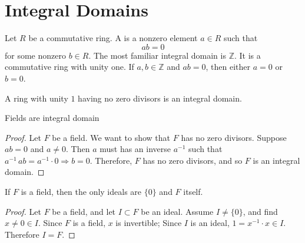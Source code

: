 \section{Integral Domains}

Let $R$ be a commutative ring. A  is a nonzero element $a \in R$ such that 
\begin{equation}
    ab=0
\end{equation}
for some nonzero $b \in R$. The most familiar integral domain is $\mathbb{Z}$. It is a 
commutative ring with unity one. If $a, b \in \mathbb{Z}$ and $ab=0$, then either $a=0$ or 
$b=0$.

\begin{definition}
    A ring with unity $1$ having no zero divisors is an integral domain.
\end{definition}

\begin{lemma}
    Fields are integral domain
\end{lemma}
\begin{proof}
    Let $F$ be a field. We want to show that $F$ has no zero divisors. Suppose $ab =0$ and 
    $a \neq 0$. Then $a$ must has an inverse $a^{-1}$ such that $a^{-1}\, a b = a^{-1} \cdot 0 \Longrightarrow b = 0$.
    Therefore, $F$ has no zero divisors, and so $F$ is an integral domain.
\end{proof}

\begin{definition}
    If $F$ is a field, then the only ideals are $\{0\}$ and $F$ itself.
\end{definition}
\begin{proof}
    Let $F$ be a field, and let $I \subset F$ be an ideal. Assume $I \neq \{0 \}$, and find $x \neq 0 \in I$. 
    Since  $F$ is a field, $x$ is invertible; Since $I$ is an ideal, $1 = x^{-1} \cdot x \in I$. Therefore $I = F$.
\end{proof}

